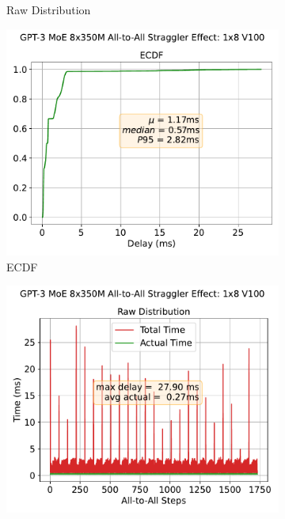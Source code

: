 \begin{figure}[!ht]
\begin{subfigure}{0.49\textwidth}
        \caption{Raw Distribution}
        \label{sub:raw_perl}
    \end{subfigure}
    \vspace{1em} %
    \begin{subfigure}{0.49\textwidth}
        \centering
        \includegraphics[width=\linewidth, keepaspectratio]{figures/GPT-3_MoE_8x350M_ecdf}
        \caption{ECDF}
        \label{sub:ecdf_az}
    \end{subfigure}
    \begin{subfigure}{0.49\textwidth}
        \centering
        \includegraphics[width=\linewidth, keepaspectratio]{figures/GPT-3_MoE_8x350M}

\end{subfigure}
\end{figure}
